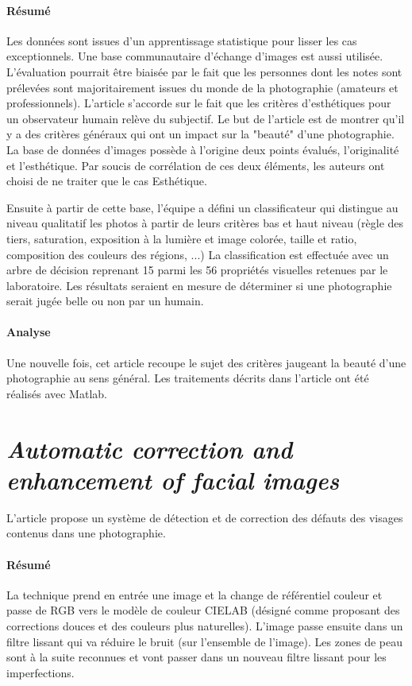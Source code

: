 \documentclass[11pt, french]{report-rd-info}
\begin{document}
\paragraph{Résumé}
Les données sont issues d'un apprentissage statistique pour lisser les cas exceptionnels. Une base communautaire d'échange d'images est aussi utilisée. L'évaluation pourrait être biaisée par le fait que les personnes dont les notes sont prélevées sont majoritairement issues du monde de la photographie (amateurs et professionnels). L'article s'accorde sur le fait que les critères d'esthétiques pour un observateur humain relève du subjectif. Le but de l'article est de montrer qu'il y a des critères généraux qui ont un impact sur la "beauté" d'une photographie. La base de données d'images possède à l'origine deux points évalués, l'originalité et l'esthétique. Par soucis de corrélation de ces deux éléments, les auteurs ont choisi de ne traiter que le cas Esthétique.

Ensuite à partir de cette base, l'équipe a défini un classificateur qui distingue au niveau qualitatif les photos à partir de leurs critères bas et haut niveau (règle des tiers, saturation, exposition à la lumière et image colorée, taille et ratio, composition des couleurs des régions, ...)
La classification est effectuée avec un arbre de décision reprenant 15 parmi les 56 propriétés visuelles retenues par le laboratoire. Les résultats seraient en mesure de déterminer si une photographie serait jugée belle ou non par un humain.

\paragraph{Analyse}
Une nouvelle fois, cet article recoupe le sujet des critères jaugeant la beauté d'une photographie au sens général. Les traitements décrits dans l’article ont été réalisés avec Matlab.


\section{\emph{Automatic correction and enhancement of facial images}}
L'article \cite{Konoplev2012} propose un système de détection et de correction des défauts des visages contenus dans une photographie.

\paragraph{Résumé}
La technique prend en entrée une image et la change de référentiel couleur et passe de RGB vers le modèle de couleur CIELAB (désigné comme proposant des corrections douces et des couleurs plus naturelles). L'image passe ensuite dans un filtre lissant qui va réduire le bruit (sur l’ensemble de l’image). Les zones de peau sont à la suite reconnues et vont passer dans un nouveau filtre lissant pour les imperfections. 
\end{document}
